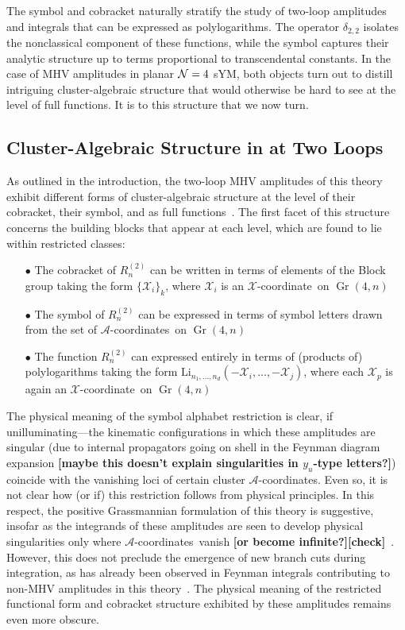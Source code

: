\documentclass[11pt]{article}
\DeclareMathOperator{\Gr}{Gr}
\def\x{\mathcal{X}}
\def\xcoord{$\mathcal{X}$-coordinate}
\def\acoords{$\mathcal{A}$-coordinates}
\def\draftnote#1{{\bf [#1]}}
\begin{document}
The symbol and cobracket naturally stratify the study of two-loop amplitudes and integrals that can be expressed as polylogarithms. The operator $\delta_{2,2}$ isolates the nonclassical component of these functions, while the symbol captures their analytic structure up to terms proportional to transcendental constants. In the case of MHV amplitudes in planar ${\cal N} = 4$ sYM, both objects turn out to distill intriguing cluster-algebraic structure that would otherwise be hard to see at the level of full functions. It is to this structure that we now turn.

\subsection{Cluster-Algebraic Structure in at Two Loops}\label{sec:cluster-algebra-R2n}


As outlined in the introduction, the two-loop MHV amplitudes of this theory exhibit different forms of cluster-algebraic structure at the level of their cobracket, their symbol, and as full functions~\cite{Golden:2013xva,Golden:2014xqa,Golden:2014xqf,Golden:2014pua}. The first facet of this structure concerns the building blocks that appear at each level, which are found to lie within restricted classes:
\begin{itemize}
\item[$\bullet$] The cobracket of $R^{(2)}_n$ can be written in terms of elements of the Block group taking the form $\{\mathcal{X}_i \}_k$, where $\x_i$ is an \xcoord\ on $\Gr(4,n)$
\item[$\bullet$] The symbol of $R^{(2)}_n$ can be expressed in terms of symbol letters drawn from the set of \acoords\ on $\Gr(4,n)$
\item[$\bullet$] The function $R^{(2)}_n$ can expressed entirely in terms of (products of) polylogarithms taking the form $\text{Li}_{n_1,\dots,n_d}(-\mathcal{X}_i,\dots,-\mathcal{X}_j)$, where each $\x_p$ is again an \xcoord\ on $\Gr(4,n)$
\end{itemize}
The physical meaning of the symbol alphabet restriction is clear, if unilluminating---the kinematic configurations in which these amplitudes are singular (due to internal propagators going on shell in the Feynman diagram expansion \draftnote{maybe this doesn't explain singularities in $y_u$-type letters?}) coincide with the vanishing loci of certain cluster \acoords. Even so, it is not clear how (or if) this restriction follows from physical principles. In this respect, the positive Grassmannian formulation of this theory is suggestive, insofar as the integrands of these amplitudes are seen to develop physical singularities only where \acoords\ vanish \draftnote{or become infinite?}\draftnote{check}~\cite{ArkaniHamed:2012nw}. However, this does not preclude the emergence of new branch cuts during integration, as has already been observed in Feynman integrals contributing to non-MHV amplitudes in this theory~\cite{Bourjaily:2018aeq,Henn:2018cdp}. The physical meaning of the restricted functional form and cobracket structure exhibited by these amplitudes remains even more obscure. 
\end{document}
